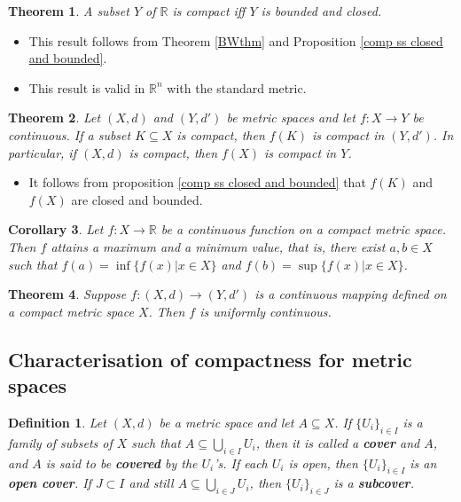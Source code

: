 \documentclass[two column]{article}
\newtheorem{theorem}{Theorem}[subsection]
\newtheorem{corollary}[theorem]{Corollary}
\newtheorem{definition}{Definition}[subsection]
\begin{document}
\begin{theorem}
A subset $Y$ of $\mathbb{R}$ is compact iff $Y$ is bounded and closed.
\end{theorem}
\begin{itemize}
\item This result follows from Theorem \ref{BWthm} and Proposition \ref{comp ss closed and bounded}. 
\item This result is valid in $\mathbb{R}^{n}$ with the standard metric. \\
\end{itemize}

\begin{theorem}
Let $(X,d)$ and $(Y,d')$ be metric spaces and let $f:X \rightarrow Y$ be continuous. If a subset $K \subseteq X$ is compact, then $f(K)$ is compact in $(Y, d')$. In particular, if $(X,d)$ is compact, then $f(X)$ is compact in $Y$. 
\end{theorem}
\begin{itemize}
\item It follows from proposition \ref{comp ss closed and bounded} that $f(K)$ and $f(X)$ are closed and bounded. \\
\end{itemize}

\begin{corollary}
Let $f:X \rightarrow \mathbb{R}$ be a continuous function on a compact metric space. Then $f$ attains a maximum and a minimum value, that is, there exist $a,b \in X$ such that $f(a) = \inf \{ f(x) \vert x \in X \}$ and $f(b) = \sup \{ f(x) \vert x \in X \}$. \\
\end{corollary}

\begin{theorem}
Suppose $f: (X,d) \rightarrow (Y,d')$ is a continuous mapping defined on a compact metric space $X$. Then $f$ is uniformly continuous. 
\end{theorem}

\subsection{Characterisation of compactness for metric spaces}

\begin{definition}
Let $(X,d)$ be a metric space and let $A \subseteq X$. If $\{ U_{i} \}_{i \in I}$ is a family of subsets of $X$ such that $A \subseteq \bigcup_{i \in I} U_{i}$, then it is called a {\bf cover} and $A$, and $A$ is said to be {\bf covered} by the $U_{i}$'s. If each $U_{i}$ is open, then $\{ U_{i} \}_{i \in I}$ is an {\bf open cover}. If $J \subset I$ and still $A \subseteq \bigcup_{i \in J} U_{i}$, then $\{ U_{i} \}_{i \in J}$ is a {\bf subcover}. \\ 
\end{definition}
\end{document}
